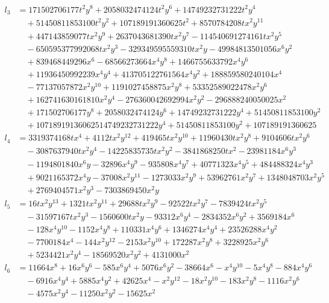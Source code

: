 \begin{align*}
l_3 &= 171502706177t^2y^8 + 2058032474124t^2y^6 + 14749232731222t^2y^4 \\
&\quad + 51450811853100t^2y^2 + 107189191360625t^2 + 8570784208tx^2y^{11} \\
&\quad + 447143859077tx^2y^9 + 2637043681390tx^2y^7 - 114540691274161tx^2y^5 \\
&\quad - 650595377992068tx^2y^3 - 329349595559310tx^2y - 49984813501056x^6y^2 \\
&\quad + 839468449296x^6 - 68566273664x^4y^8 + 1466755633792x^4y^6 \\
&\quad + 11936450992239x^4y^4 + 413705122761564x^4y^2 + 188859580240104x^4 \\
&\quad - 77137057872x^2y^{10} + 1191027458875x^2y^8 + 53352589022478x^2y^6 \\
&\quad + 162741630161810x^2y^4 - 276360042692994x^2y^2 - 296888240050025x^2 \\
&\quad + 171502706177y^8 + 2058032474124y^6 + 14749232731222y^4 + 51450811853100y^2 \\
&\quad + 10718919136062514749232731222y^4 + 51450811853100y^2 + 107189191360625\\
l_4 &= 3319374168tx^4 + 4112tx^2y^{12} + 419465tx^2y^{10} + 11960430tx^2y^8 + 9104606tx^2y^6 \\
&\quad - 3087637940tx^2y^4 - 14225835735tx^2y^2 - 3841868250tx^2 - 23981184x^6y^3 \\
&\quad - 1194801840x^6y - 32896x^4y^9 - 935808x^4y^7 + 40771323x^4y^5 + 484488324x^4y^3 \\
&\quad + 9021165372x^4y - 37008x^2y^{11} - 1273033x^2y^9 + 53962761x^2y^7 + 1348048703x^2y^5 \\
&\quad + 2769404571x^2y^3 - 7303869450x^2y \\
l_5 &= 16tx^2y^{13} + 1321tx^2y^{11} + 29688tx^2y^9 - 92522tx^2y^7 - 7839424tx^2y^5  \\
&\quad - 31597167tx^2y^3 - 1560600tx^2y - 93312x^6y^4 - 2834352x^6y^2 + 3569184x^6 \\
&\quad - 128x^4y^{10} - 1152x^4y^8 + 110331x^4y^6 + 1346274x^4y^4 + 23526288x^4y^2  \\
&\quad - 7700184x^4 - 144x^2y^{12} - 2153x^2y^{10} + 172287x^2y^8 + 3228925x^2y^6  \\
&\quad + 5234421x^2y^4 - 18569520x^2y^2 + 4131000x^2 \\
l_6 &= 11664x^8 + 16x^6y^6 - 585x^6y^4 + 5076x^6y^2 - 38664x^6 - x^4y^{10} - 5x^4y^8 - 884x^4y^6 \\
&\quad - 6916x^4y^4 + 5885x^4y^2 + 42625x^4 - x^2y^{12} - 18x^2y^{10} - 183x^2y^8 - 1116x^2y^6\\
&\quad - 4575x^2y^4 - 11250x^2y^2 - 15625x^2\\
\end{align*}

